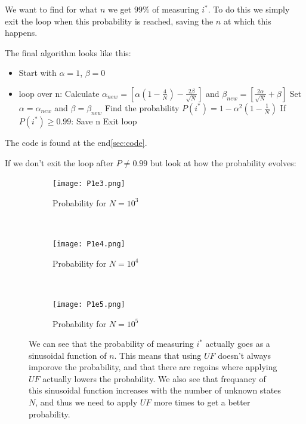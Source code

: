 \documentclass[a4paper,norsk, 10pt]{article}
\begin{document}
We want to find for what $n$ we get $99\%$ of measuring $i^*$. To do this we simply exit the loop when this probability is reached, saving the $n$ at which this happens.

The final algorithm looks like this:

\begin{itemize}\label{item:algo}
\item Start with $\alpha = 1$, $\beta = 0$
\item loop over n:
\subitem Calculate $\alpha_{new} = \left[\alpha\left(1 - \frac{4}{N}\right) - \frac{2\beta}{\sqrt{N}}\right]$ and $\beta_{new} = \left[\frac{2\alpha}{\sqrt{N}} + \beta\right]$
\subitem Set $\alpha = \alpha_{new}$ and $\beta = \beta_{new}$
\subitem Find the probability $P(i^*) = 1 - \alpha^2\left(1 - \frac{1}{N}\right)$
\subitem If $P(i^*) \geq 0.99$:
\subsubitem Save n
\subsubitem Exit loop
\end{itemize}

The code is found at the end\ref{sec:code}.


If we don't exit the loop after $P \neq 0.99$ but look at how the probability evolves:

\begin{figure}[H]
    \centering
    \begin{subfigure}[b]{0.3\textwidth}
        \texttt{[image: P1e3.png]}
        \caption{Probability for $N = 10^3$}
        \label{fig:P1e3}
    \end{subfigure}
    ~ %
    \begin{subfigure}[b]{0.3\textwidth}
        \texttt{[image: P1e4.png]}
        \caption{Probability for $N = 10^4$}
        \label{fig:P1e4}
    \end{subfigure}
    ~ %
    \begin{subfigure}[b]{0.3\textwidth}
        \texttt{[image: P1e5.png]}
        \caption{Probability for $N = 10^5$}
        \label{fig:P1e5}
    \end{subfigure}
    \caption{We can see that the probability of measuring $i^*$ actually goes as a sinusoidal function of $n$. This means that using $UF$ doesn't always imporove the probability, and that there are regoins where applying $UF$ actually lowers the probability. We also see that frequancy of this sinusoidal function increases with the number of unknown states $N$, and thus we need to apply $UF$ more times to get a better probability.}\label{fig:prob}
\end{figure}
\end{document}

